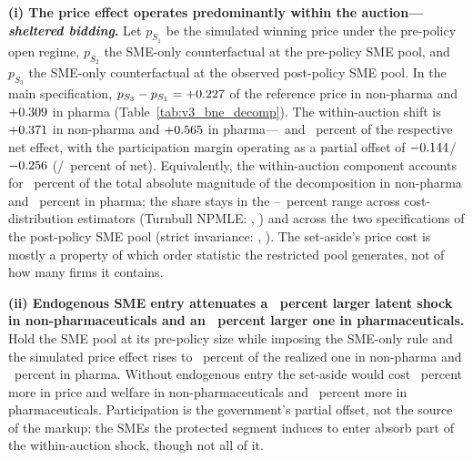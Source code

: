 \noindent\textbf{(i) The price effect operates predominantly within the auction---\emph{sheltered bidding}.} Let $p_{S_1}$ be the simulated winning price under the pre-policy open regime, $p_{S_2}$ the SME-only counterfactual at the pre-policy SME pool, and $p_{S_3}$ the SME-only counterfactual at the observed post-policy SME pool. In the main specification, $p_{S_3} - p_{S_1} = +0.227$ of the reference price in non-pharma and $+0.309$ in pharma (Table~\ref{tab:v3_bne_decomp}). The within-auction shift is $+0.371$ in non-pharma and $+0.565$ in pharma---\bneIntensRelNetNp{}~and \bneIntensRelNetPh~percent of the respective net effect, with the participation margin operating as a partial offset of $-0.144$/$-0.256$ (\bneEntryRelNetNp/\bneEntryRelNetPh~percent of net). Equivalently, the within-auction component accounts for \bneShareIntensNp~percent of the total absolute magnitude of the decomposition in non-pharma and \bneShareIntensPh~percent in pharma; the share stays in the \withinShareLow--\withinShareHigh~percent range across cost-distribution estimators (Turnbull NPMLE: \turnbullShareNp, \turnbullSharePh) and across the two specifications of the post-policy SME pool (strict invariance: \strictShareNp, \strictSharePh). The set-aside's price cost is mostly a property of which order statistic the restricted pool generates, not of how many firms it contains.

\noindent\textbf{(ii) Endogenous SME entry attenuates a \latentShockRatioNp~percent larger latent shock in non-pharmaceuticals and an \latentShockRatioPh~percent larger one in pharmaceuticals.} Hold the SME pool at its pre-policy size while imposing the SME-only rule and the simulated price effect rises to \latentShockTimesNp~percent of the realized one in non-pharma and \latentShockTimesPh~percent in pharma. Without endogenous entry the set-aside would cost \latentShockRatioNp~percent more in price and welfare in non-pharmaceuticals and \latentShockRatioPh~percent more in pharmaceuticals. Participation is the government's partial offset, not the source of the markup: the SMEs the protected segment induces to enter absorb part of the within-auction shock, though not all of it.

